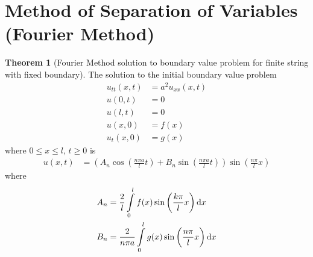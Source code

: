 \documentclass[titlepage, fleqn, a4paper, 12pt, twoside]{article}
\theoremstyle{definition}
\theoremstyle{theorem}
\newtheorem{theorem}{Theorem}
\begin{document}
\section{Method of Separation of Variables (Fourier Method)}

\begin{theorem}[Fourier Method solution to boundary value problem for finite string with fixed boundary]
	The solution to the initial boundary value problem
	\begin{align*}
		u_{t t}(x,t) & = a^2 u_{x x}(x,t) \\
		u(0,t)       & = 0                \\
		u(l,t)       & = 0                \\
		u(x,0)       & = f(x)             \\
		u_t(x,0)     & = g(x)
	\end{align*}
	where $0 \le x \le l$, $t \ge 0$ is
	\begin{align*}
		u(x,t) & = \left( A_n \cos\left( \frac{n \pi a}{l} t \right) + B_n \sin\left( \frac{n \pi a}{l} t \right) \right) \sin\left( \frac{n \pi}{l} x \right)
	\end{align*}
	where
	\begin{align*}
		A_n & = \frac{2}{l} \int\limits_{0}^{l} f(x) \sin\left( \frac{k \pi}{l} x \right) \dif x \\
		B_n & = \frac{2}{n \pi a} \int\limits_{0}^{l} g(x) \sin\left( \frac{n \pi}{l} x \right) \dif x
	\end{align*}
	\label{thm:Fourier_Method_solution_to_boundary_value_problem_for_finite_string_with_fixed_boundary}
\end{theorem}
\end{document}
